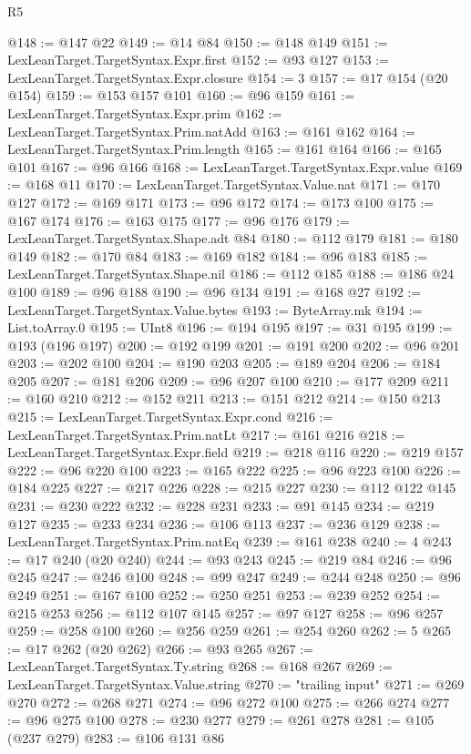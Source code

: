 \begin{lexlean}{R5}
\begin{coremodule}
@148 := @147 @22
@149 := @14 @84
@150 := @148 @149
@151 := LexLeanTarget.TargetSyntax.Expr.first
@152 := @93 @127
@153 := LexLeanTarget.TargetSyntax.Expr.closure
@154 := 3
@157 := @17 @154 (@20 @154)
@159 := @153 @157 @101
@160 := @96 @159
@161 := LexLeanTarget.TargetSyntax.Expr.prim
@162 := LexLeanTarget.TargetSyntax.Prim.natAdd
@163 := @161 @162
@164 := LexLeanTarget.TargetSyntax.Prim.length
@165 := @161 @164
@166 := @165 @101
@167 := @96 @166
@168 := LexLeanTarget.TargetSyntax.Expr.value
@169 := @168 @11
@170 := LexLeanTarget.TargetSyntax.Value.nat
@171 := @170 @127
@172 := @169 @171
@173 := @96 @172
@174 := @173 @100
@175 := @167 @174
@176 := @163 @175
@177 := @96 @176
@179 := LexLeanTarget.TargetSyntax.Shape.adt @84
@180 := @112 @179
@181 := @180 @149
@182 := @170 @84
@183 := @169 @182
@184 := @96 @183
@185 := LexLeanTarget.TargetSyntax.Shape.nil
@186 := @112 @185
@188 := @186 @24 @100
@189 := @96 @188
@190 := @96 @134
@191 := @168 @27
@192 := LexLeanTarget.TargetSyntax.Value.bytes
@193 := ByteArray.mk
@194 := List.toArray.{0}
@195 := UInt8
@196 := @194 @195
@197 := @31 @195
@199 := @193 (@196 @197)
@200 := @192 @199
@201 := @191 @200
@202 := @96 @201
@203 := @202 @100
@204 := @190 @203
@205 := @189 @204
@206 := @184 @205
@207 := @181 @206
@209 := @96 @207 @100
@210 := @177 @209
@211 := @160 @210
@212 := @152 @211
@213 := @151 @212
@214 := @150 @213
@215 := LexLeanTarget.TargetSyntax.Expr.cond
@216 := LexLeanTarget.TargetSyntax.Prim.natLt
@217 := @161 @216
@218 := LexLeanTarget.TargetSyntax.Expr.field
@219 := @218 @116
@220 := @219 @157
@222 := @96 @220 @100
@223 := @165 @222
@225 := @96 @223 @100
@226 := @184 @225
@227 := @217 @226
@228 := @215 @227
@230 := @112 @122 @145
@231 := @230 @222
@232 := @228 @231
@233 := @91 @145
@234 := @219 @127
@235 := @233 @234
@236 := @106 @113
@237 := @236 @129
@238 := LexLeanTarget.TargetSyntax.Prim.natEq
@239 := @161 @238
@240 := 4
@243 := @17 @240 (@20 @240)
@244 := @93 @243
@245 := @219 @84
@246 := @96 @245
@247 := @246 @100
@248 := @99 @247
@249 := @244 @248
@250 := @96 @249
@251 := @167 @100
@252 := @250 @251
@253 := @239 @252
@254 := @215 @253
@256 := @112 @107 @145
@257 := @97 @127
@258 := @96 @257
@259 := @258 @100
@260 := @256 @259
@261 := @254 @260
@262 := 5
@265 := @17 @262 (@20 @262)
@266 := @93 @265
@267 := LexLeanTarget.TargetSyntax.Ty.string
@268 := @168 @267
@269 := LexLeanTarget.TargetSyntax.Value.string
@270 := "trailing input"
@271 := @269 @270
@272 := @268 @271
@274 := @96 @272 @100
@275 := @266 @274
@277 := @96 @275 @100
@278 := @230 @277
@279 := @261 @278
@281 := @105 (@237 @279)
@283 := @106 @131 @86

\end{coremodule}
\end{lexlean}
